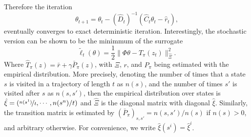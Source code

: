 \documentclass{article} %
\theoremstyle{definition}
\begin{document}
Therefore the iteration
\[
\theta_{t+1} = \theta_t - (\hat{D}_t)^{-1}(\hat{C}_t\theta_t -\hat{r}_t), 
\]
eventually converges to exact deterministic iteration.
Interestingly, the stochastic version can be shown to be the minimmum of the surrogate
 \[
 \tilde{\ell}_t(\theta) = \frac{1}{2}\|\Phi \theta - \hat{T}_{\pi}(z_t)\|^2_{\hat{\Xi}}.
 \] 
 Where $\hat{T}_{\pi}(z) = \bar{r} + \gamma \bar{P}_\pi(z)$, with $\Xi$, $r$, and $P_{\pi}$ being estimated with the empirical distribution.
 More precisely, denoting the number of times that a state $s$ is visited in a trajectory of length $t$ as $n(s)$, and the number of times $s'$ is visited after $s$ as $n(s,s')$, then the empirical distribution over states is  $\hat{\xi}= (\nicefrac{n(s^1)}{t},\cdots, n(s^n)/t)$ and $\hat{\Xi}$ is the diagonal matrix with diagonal $\hat{\xi}$. 
 Similarly, the transition matrix is estimated by $(\bar{P}_{\pi})_{s,s'} = n(s,s')/n(s)$ if $n(s) > 0$, and arbitrary otherwise.
 For convenience, we write $\hat{\xi}(s^i) = \hat{\xi}^i$. 
\end{document}
